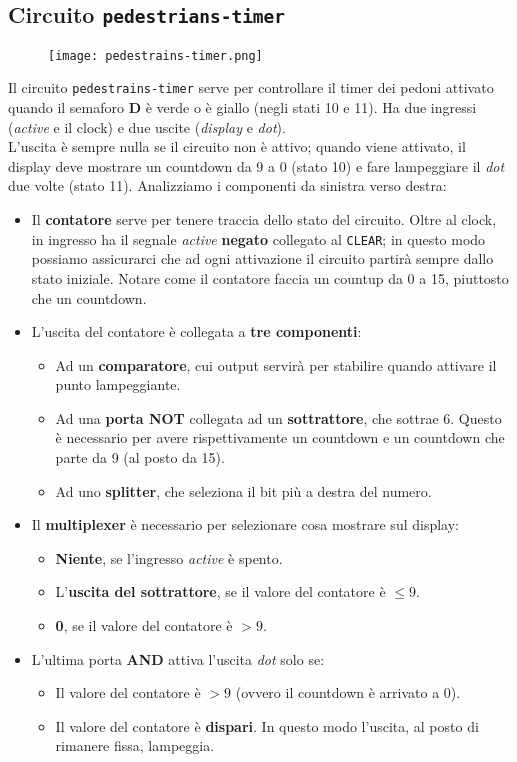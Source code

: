 \documentclass{article}
\def\code#1{\texttt{#1}}
\begin{document}
\subsection{Circuito \code{pedestrians-timer}}
\begin{figure}[htp]
    \texttt{[image: pedestrains-timer.png]}
\end{figure}
Il circuito \code{pedestrains-timer} serve per controllare il timer dei pedoni attivato quando il semaforo \textbf{D} è verde o è giallo (negli stati 10 e 11). Ha due ingressi (\textit{active} e il clock) e due uscite (\textit{display} e \textit{dot}). \\
L'uscita è sempre nulla se il circuito non è attivo; quando viene attivato, il display deve mostrare un countdown da 9 a 0 (stato 10) e fare lampeggiare il \textit{dot} due volte (stato 11). 
Analizziamo i componenti da sinistra verso destra:
\begin{itemize}
    \item Il \textbf{contatore} serve per tenere traccia dello stato del circuito. Oltre al clock, in ingresso ha il segnale \textit{active} \textbf{negato} collegato al \code{CLEAR}; in questo modo possiamo assicurarci che ad ogni attivazione il circuito partirà sempre dallo stato iniziale. Notare come il contatore faccia un countup da 0 a 15, piuttosto che un countdown.
    \item L'uscita del contatore è collegata a \textbf{tre componenti}:
    \begin{itemize}
        \item Ad un \textbf{comparatore}, cui output servirà per stabilire quando attivare il punto lampeggiante.
        \item Ad una \textbf{porta NOT} collegata ad un \textbf{sottrattore}, che sottrae 6. Questo è necessario per avere rispettivamente un countdown e un countdown che parte da 9 (al posto da 15).
        \item Ad uno \textbf{splitter}, che seleziona il bit più a destra del numero.
    \end{itemize}
    \item Il \textbf{multiplexer} è necessario per selezionare cosa mostrare sul display:
    \begin{itemize}
        \item \textbf{Niente}, se l'ingresso \textit{active} è spento.
        \item L'\textbf{uscita del sottrattore}, se il valore del contatore è $\leq 9$.
        \item \textbf{0}, se il valore del contatore è $> 9$.
    \end{itemize}
    \item L'ultima porta \textbf{AND} attiva l'uscita \textit{dot} solo se:
    \begin{itemize}
        \item Il valore del contatore è \textbf{$>9$} (ovvero il countdown è arrivato a 0).
        \item Il valore del contatore è \textbf{dispari}. In questo modo l'uscita, al posto di rimanere fissa, lampeggia. 
    \end{itemize}
\end{itemize}
\end{document}
